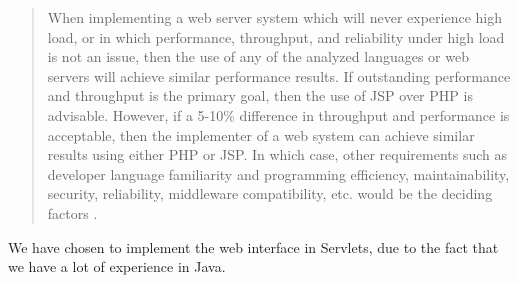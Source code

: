 \begin{quotation}
When implementing a web server system which will never experience high load, or in
which performance, throughput, and reliability under high load is not an issue, then
the use of any of the analyzed languages or web servers will achieve similar
performance results. If outstanding performance and throughput is the primary goal,
then the use of JSP over PHP is advisable. However, if a 5-10\% difference in
throughput and performance is acceptable, then the implementer of a web system can
achieve similar results using either PHP or JSP. In which case, other requirements
such as developer language familiarity and programming efficiency, maintainability,
security, reliability, middleware compatibility, etc. would be the deciding factors \cite[p. 181]{servletVsPHP}.
\end{quotation}

We have chosen to implement the web interface in Servlets, due to the fact that we have a lot of experience in Java.